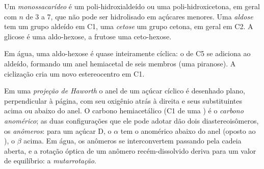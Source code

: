\begin{definition}[Monossacarídeos]\label{def:b2:biomolecules:sugar}
Um \emph{monossacarídeo} é um poli-hidroxialdeído ou uma poli-hidroxicetona, em geral
 com $n$ de 3 a 7, que não pode ser hidrolisado em açúcares menores. Uma
\emph{aldose} tem um grupo aldeído em C1, uma \emph{cetose} um grupo cetona,
em geral em C2. A glicose é uma aldo-hexose, a frutose uma ceto-hexose.
\end{definition}

Em água, uma aldo-hexose é quase inteiramente cíclica: o  de C5 se adiciona ao aldeído, formando
um anel hemiacetal de seis membros (uma piranose). A ciclização cria um novo estereocentro em C1.

\begin{definition}[Anômeros]\label{def:b2:biomolecules:anomer}
Em uma \emph{projeção de Haworth} o anel de um açúcar cíclico é desenhado plano,
perpendicular à página, com seu oxigênio atrás à direita e seus substituintes acima ou abaixo do
anel. O carbono hemiacetálico (C1 de uma ) é o \emph{carbono anomérico}; as
duas configurações que ele pode adotar dão dois diastereoisômeros, os \emph{anômeros}: para
um açúcar D, o $\alpha$ tem o  anomérico abaixo do anel (oposto ao ), o $\beta$ acima.
Em água, os anômeros se interconvertem passando pela cadeia aberta, e a rotação óptica de um anômero
recém-dissolvido deriva para um valor de equilíbrio: a \emph{mutarrotação}.
\end{definition}

